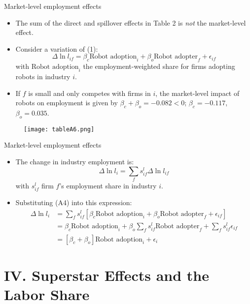 \documentclass[notes=show]{beamer}
\begin{document}
\begin{frame}{Market-level employment effects}
\begin{itemize}
\item The sum of the direct and spillover effects in Table 2 is \textit{not} the market-level effect. \medskip
\item Consider a variation of (1):
\[
\Delta \ln l_{if} = \beta_{c} \text{Robot adoption}_{i} + \beta_{o} \text{Robot adopter}_{f} + \epsilon_{if} \tag{A4} \label{eqA4}
\]
with $ \text{Robot adoption}_{i} $ the employment-weighted share for firms adopting robots in industry $i$. \medskip
\item If $f$ is small and only competes with firms in $i$, the market-level impact of robots on employment is given by $ \beta_{c} + \beta_{o} = -0.082 < 0$; $\beta_{c} = -0.117$, $\beta_{o} = 0.035$.
\end{itemize}
\end{frame}

\newpage
\begin{center}
\vspace*{0.2cm}
\begin{figure}
\texttt{[image: tableA6.png]}
\end{figure} 
\end{center}
\newpage

\begin{frame}{Market-level employment effects}
\begin{itemize}
\item The change in industry employment is:
\[
\Delta \ln l_{i} = \sum_{f} s_{if}^{l} \Delta \ln l_{if}
\] 
with $ s_{if}^{l} $ firm $f$'s employment share in industry $i$. \medskip
\item Substituting (A4) into this expression:
\begin{align*}
\Delta \ln l_{i} & = \sum_{f} s_{if}^{l} \left[  \beta_{c} \text{Robot adoption}_{i} + \beta_{o} \text{Robot adopter}_{f} + \epsilon_{if} \right] \\
& =  \beta_{c} \text{Robot adoption}_{i} + \beta_{o} \sum_{f} s_{if}^{l} \text{Robot adopter}_{f} + \sum_{f} s_{if}^{l} \epsilon_{if} \\
& = [\beta_{c} + \beta_{o}] \text{Robot adoption}_{i} + \epsilon_{i}
\end{align*} 
\end{itemize}
\end{frame}

\section{IV. Superstar Effects and the Labor Share}
\end{document}

